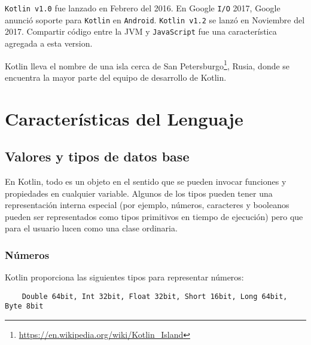 \texttt{Kotlin v1.0} fue lanzado en Febrero del 2016\cite{kotlin-v1}. En Google \texttt{I/O} 2017, Google anunció soporte para \texttt{Kotlin} en \texttt{Android}\cite{kotlin-in-android}. \texttt{Kotlin v1.2} se lanzó en Noviembre del 2017. Compartir código entre la JVM y \texttt{JavaScript} fue una característica agregada a esta version\cite{kotlin-v12}.

Kotlin lleva el nombre de una isla cerca de San Petersburgo\footnote{\url{https://en.wikipedia.org/wiki/Kotlin_Island}}, Rusia, donde se encuentra la mayor parte del equipo de desarrollo de Kotlin\cite{kotlin-in-action}.



\section{Características del Lenguaje}

\subsection{Valores y tipos de datos base}
En Kotlin, todo es un objeto en el sentido que se pueden invocar funciones y propiedades en cualquier variable. Algunos de los tipos pueden tener una representación interna especial (por ejemplo, números, caracteres y booleanos pueden ser representados como tipos primitivos en tiempo de ejecución) pero que para el usuario lucen como una clase ordinaria. 

\subsubsection{Números}
Kotlin proporciona las siguientes tipos para representar números:
\begin{verbatim}
    Double 64bit, Int 32bit, Float 32bit, Short 16bit, Long 64bit, Byte 8bit
\end{verbatim}


